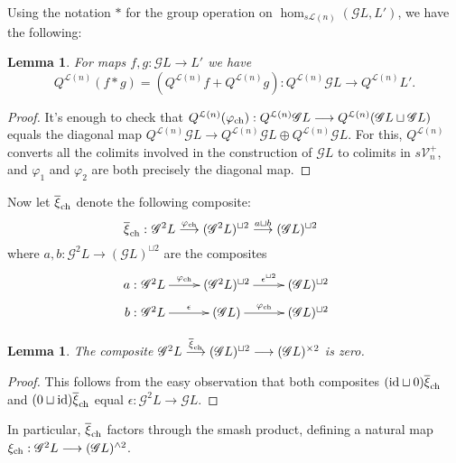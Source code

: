 \documentclass[11pt]{amsart}
\theoremstyle{plain}
\newtheorem{lem}[thm]{Lemma}
\theoremstyle{definition}
\let\phi\varphi
\renewcommand{\to}{\longrightarrow}
\newcommand{\scrG}{\mathscr{G}}
\newcommand{\calL}{\mathcal{L}}
\newcommand{\calV}{\mathcal{V}}
\theoremstyle{plain}
\newcommand{\vect}[2]{\calV^{#1}_{#2}}
\newcommand{\BSW}{{\scrG}}
\newcommand{\Id}{\textup{id}}
\begin{document}
\begin{comp func sseq old version}
\begin{shaded}
Using the notation $*$ for the group operation on $\hom_{s\calL(n)}(\BSW L,L')$, we have the following:
\begin{lem}
For maps $f,g:\BSW L\to L'$ we have 
\[Q^{\calL(n)}(f*g)=(Q^{\calL(n)}f+Q^{\calL(n)}g):Q^{\calL(n)}\BSW L\to Q^{\calL(n)}L'.\]
\end{lem}
\begin{proof}
It's enough to check that $Q^{\calL(n)}(\phi_\textup{ch}):Q^{\calL(n)}\BSW L\to Q^{\calL(n)}(\BSW L\sqcup \BSW L)$ equals the diagonal map $Q^{\calL(n)}\BSW L\to Q^{\calL(n)}\BSW L\oplus Q^{\calL(n)}\BSW L$. For this, $Q^{\calL(n)}$ converts all the colimits involved in the construction of $\BSW L$ to colimits in $s\vect{+}{n}$, and $\phi_1$ and $\phi_2$ are both precisely the diagonal map.
\end{proof}

Now let $\overline{\xi}_{\textup{ch}}$ denote the following composite:
\[\makebox[0mm][r]{$\overline{\xi}_{\textup{ch}}:\ $}\BSW^2L\overset{\phi_{\textup{ch}}}{\to}(\BSW^2L)^{\sqcup2}\overset{a\sqcup b}{\to}(\BSW L)^{\sqcup2}\]
where $a,b:\BSW^2L\to(\BSW L)^{\sqcup2}$ are the composites
\[\xymatrix@R=2mm{
\makebox[0mm][r]{$a:\ $}\BSW^2L\ar[r]^-{\phi_{\textup{ch}}}
&%
(\BSW^2L)^{\sqcup2}\ar[r]^-{\epsilon^{\sqcup2}}
&%
(\BSW L)^{\sqcup2}\\
\makebox[0mm][r]{$b:\ $}\BSW^2L\ar[r]^-{\epsilon}
&%
(\BSW L)\ar[r]^-{\phi_{\textup{ch}}}
&%
(\BSW L)^{\sqcup2}
}\]
\begin{lem}
The composite 
$\BSW^2L\overset{\overline{\xi}_{\textup{ch}}}{\to}(\BSW L)^{\sqcup2}\to(\BSW L)^{\times2}$ is zero.
\end{lem}
\begin{proof}
This follows from the easy observation that both composites $(\Id\sqcup0)\overline{\xi}_{\textup{ch}}$ and $(0\sqcup\Id)\overline{\xi}_{\textup{ch}}$ equal $\epsilon:\BSW^2L\to \BSW L$.
\end{proof}
In particular, $\overline{\xi}_{\textup{ch}}$ factors through the smash product, defining a natural map $\xi_{\textup{ch}}:\BSW^2L\to (\BSW L)^{\wedge 2}$.


\end{shaded}
\end{comp func sseq old version}
\end{document}
